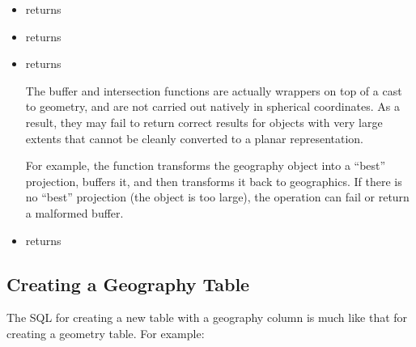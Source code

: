 \documentclass[a4paper,11pt,english]{sphinxmanual}
\begin{document}
\begin{itemize}
\item {} 
 returns 

\item {} 
 returns 

\item {} 
 returns  %
\begin{footnote}[3]\sphinxAtStartFootnote
The buffer and intersection functions are actually wrappers on top of a cast to geometry, and are not carried out natively in spherical coordinates. As a result, they may fail to return correct results for objects with very large extents that cannot be cleanly converted to a planar representation.

For example, the  function transforms the geography object into a “best” projection, buffers it, and then transforms it back to geographics. If there is no “best” projection (the object is too large), the operation can fail or return a malformed buffer.
%
\end{footnote}

\item {} 
 returns  \sphinxfootnotemark[3]

\end{itemize}


\subsection{Creating a Geography Table}
\label{\detokenize{basic:creating-a-geography-table}}
The SQL for creating a new table with a geography column is much like that for creating a geometry table. For example:

\begin{sphinxVerbatim}[commandchars=\\\{\}]
   
   
   

     
     
     
\end{sphinxVerbatim}
\end{document}
